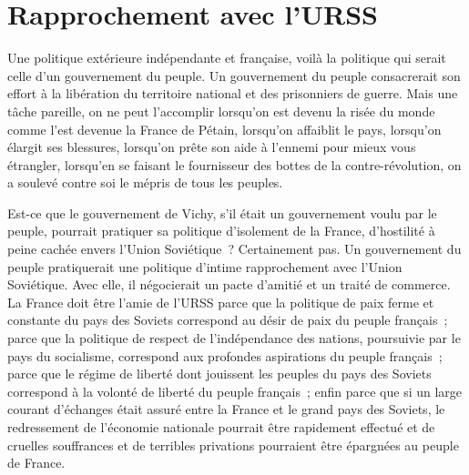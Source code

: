 \documentclass[french,twoside]{book} %
\begin{document}
\section[{Rapprochement avec l’URSS}]{Rapprochement avec l’URSS}
\noindent Une politique extérieure indépendante et française, voilà la politique qui serait celle d’un gouvernement du peuple. Un gouvernement du peuple consacrerait son effort à la libération du territoire national et des prisonniers de guerre. Mais une tâche pareille, on ne peut l’accomplir lorsqu’on est devenu la risée du monde comme l’est devenue la France de Pétain, lorsqu’on affaiblit le pays, lorsqu’on élargit ses blessures, lorsqu’on prête son aide à l’ennemi pour mieux vous étrangler, lorsqu’en se faisant le fournisseur des bottes de la contre-révolution, on a soulevé contre soi le mépris de tous les peuples.\par
Est-ce que le gouvernement de Vichy, s’il était un gouvernement voulu par le peuple, pourrait pratiquer sa politique d’isolement de la France, d’hostilité à peine cachée envers l’Union Soviétique ? Certainement pas. Un gouvernement du peuple pratiquerait une politique d’intime rapprochement avec l’Union Soviétique. Avec elle, il négocierait un pacte d’amitié et un traité de commerce. La France doit être l’amie de l’URSS parce que la politique de paix ferme et constante du pays des Soviets correspond au désir de paix du peuple français ; parce que la politique de respect de l’indépendance des nations, poursuivie par le pays du socialisme, correspond aux profondes aspirations du peuple français ; parce que le régime de liberté dont jouissent les peuples du pays des Soviets correspond à la volonté de liberté du peuple français ; enfin parce que si un large courant d’échanges était assuré entre la France et le grand pays des Soviets, le redressement de l’économie nationale pourrait être rapidement effectué et de cruelles souffrances et de terribles privations pourraient être épargnées au peuple de France.
\end{document}
